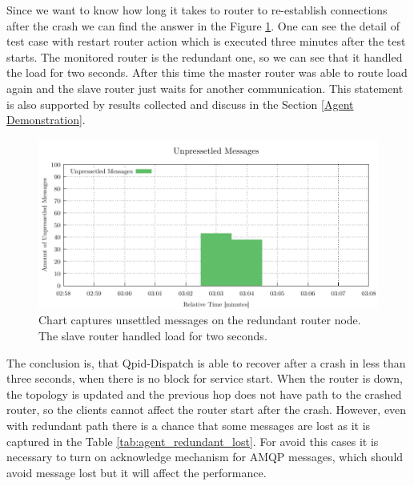 Since we want to know how long it takes to router to re-establish connections after the crash we can find the answer in the Figure \ref{fig:agent-redundant-unpressetled}. One can see the detail of test case with restart router action which is executed three minutes after the test starts. The monitored router is the redundant one, so we can see that it handled the load for two seconds. After this time the master router was able to route load again and the slave router just waits for another communication. This statement is also supported by results collected and discuss in the Section \ref{Agent Demonstration}.

\begin{figure}[H]
	\centering
	\includegraphics[width=1\linewidth]{obrazky-figures/charts/restart-redundant-agent-routerLink.pdf}
	\caption{Chart captures unsettled messages on the redundant router node. The slave router handled load for two seconds.}
	\label{fig:agent-redundant-unpressetled}
\end{figure}

The conclusion is, that Qpid-Dispatch is able to recover after a crash in less than three seconds, when there is no block for service start. When the router is down, the topology is updated and the previous hop does not have path to the crashed router, so the clients cannot affect the router start after the crash. However, even with redundant path there is a chance that some messages are lost as it is captured in the Table \ref{tab:agent_redundant_lost}. For avoid this cases it is necessary to turn on acknowledge mechanism for AMQP messages, which should avoid message lost but it will affect the performance.


